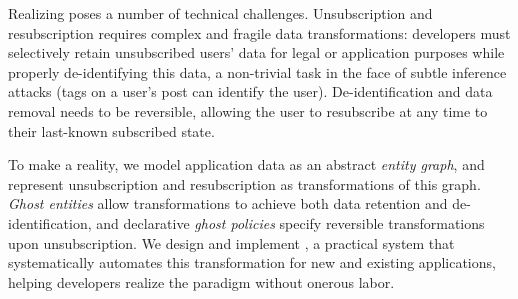 Realizing \name poses a number of technical challenges.
Unsubscription and resubscription requires complex and fragile data transformations: developers must
selectively retain unsubscribed users' data for legal or application purposes while properly
de-identifying this data, a non-trivial task in the face of subtle inference attacks (\eg tags on a
user's post can identify the user). De-identification and data removal needs to be reversible,
allowing the user to resubscribe at any time to their last-known subscribed state.

To make \name a reality, we model application data as an abstract \emph{entity graph}, and
represent unsubscription and resubscription as transformations of this graph.
\emph{Ghost entities} allow transformations to achieve both data retention and de-identification,
and declarative \emph{ghost policies} specify reversible transformations upon unsubscription.
We design and implement \sys, a practical system that systematically automates this transformation for new and existing applications, helping developers realize the \name paradigm without onerous labor.
\fi
